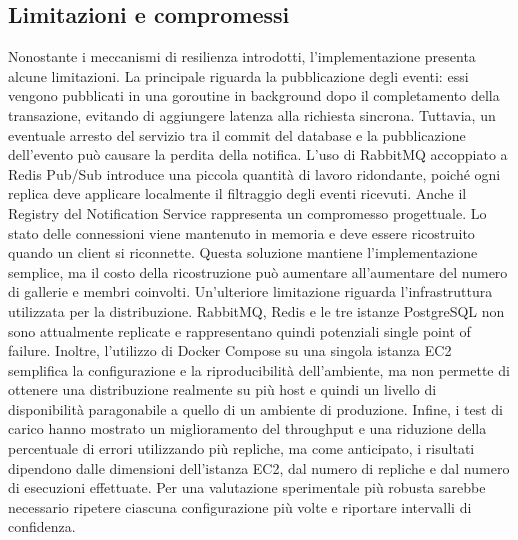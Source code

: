 \documentclass[conference]{IEEEtran}
\begin{document}
\subsection{Limitazioni e compromessi}
Nonostante i meccanismi di resilienza introdotti, l'implementazione presenta alcune limitazioni. La principale riguarda la pubblicazione degli eventi: essi vengono pubblicati in una goroutine in background dopo il completamento della transazione, evitando di aggiungere latenza alla richiesta sincrona. Tuttavia, un eventuale arresto del servizio tra il commit del database e la pubblicazione dell'evento può causare la perdita della notifica. L'uso di RabbitMQ accoppiato a Redis Pub/Sub introduce una piccola quantità di lavoro ridondante, poiché ogni replica deve applicare localmente il filtraggio degli eventi ricevuti. Anche il Registry del Notification Service rappresenta un compromesso progettuale. Lo stato delle connessioni viene mantenuto in memoria e deve essere ricostruito quando un client si riconnette. Questa soluzione mantiene l'implementazione semplice, ma il costo della ricostruzione può aumentare all'aumentare del numero di gallerie e membri coinvolti. Un'ulteriore limitazione riguarda l'infrastruttura utilizzata per la distribuzione. RabbitMQ, Redis e le tre istanze PostgreSQL non sono attualmente replicate e rappresentano quindi potenziali single point of failure. Inoltre, l'utilizzo di Docker Compose su una singola istanza EC2 semplifica la configurazione e la riproducibilità dell'ambiente, ma non permette di ottenere una distribuzione realmente su più host e quindi un livello di disponibilità paragonabile a quello di un ambiente di produzione. Infine, i test di carico hanno mostrato un miglioramento del throughput e una riduzione della percentuale di errori utilizzando più repliche, ma come anticipato, i risultati dipendono dalle dimensioni dell'istanza EC2, dal numero di repliche e dal numero di esecuzioni effettuate. Per una valutazione sperimentale più robusta sarebbe necessario ripetere ciascuna configurazione più volte e riportare intervalli di confidenza.
\end{document}
